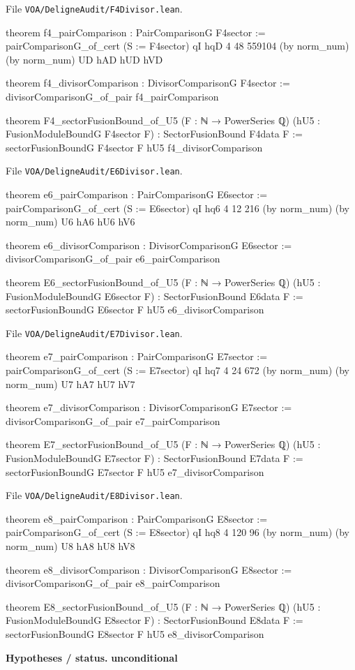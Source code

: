 \documentclass[11pt,openany]{book}
\newcommand{\leanpath}[1]{\texttt{\small #1}}
\theoremstyle{definition}
\theoremstyle{plain}
\begin{document}
{\raggedright\noindent File \leanpath{VOA/\allowbreak DeligneAudit/\allowbreak F4Divisor.lean}.\par}
\begin{leancode}
theorem f4_pairComparison : PairComparisonG F4sector :=
  pairComparisonG_of_cert (S := F4sector) qI hqD 4 48 559104 (by norm_num) (by norm_num) UD hAD hUD hVD

theorem f4_divisorComparison : DivisorComparisonG F4sector :=
  divisorComparisonG_of_pair f4_pairComparison

theorem F4_sectorFusionBound_of_U5 (F : ℕ → PowerSeries ℚ) (hU5 : FusionModuleBoundG F4sector F) :
    SectorFusionBound F4data F :=
  sectorFusionBoundG F4sector F hU5 f4_divisorComparison
\end{leancode}
{\raggedright\noindent File \leanpath{VOA/\allowbreak DeligneAudit/\allowbreak E6Divisor.lean}.\par}
\begin{leancode}
theorem e6_pairComparison : PairComparisonG E6sector :=
  pairComparisonG_of_cert (S := E6sector) qI hq6 4 12 216 (by norm_num) (by norm_num) U6 hA6 hU6 hV6

theorem e6_divisorComparison : DivisorComparisonG E6sector :=
  divisorComparisonG_of_pair e6_pairComparison

theorem E6_sectorFusionBound_of_U5 (F : ℕ → PowerSeries ℚ) (hU5 : FusionModuleBoundG E6sector F) :
    SectorFusionBound E6data F :=
  sectorFusionBoundG E6sector F hU5 e6_divisorComparison
\end{leancode}
{\raggedright\noindent File \leanpath{VOA/\allowbreak DeligneAudit/\allowbreak E7Divisor.lean}.\par}
\begin{leancode}
theorem e7_pairComparison : PairComparisonG E7sector :=
  pairComparisonG_of_cert (S := E7sector) qI hq7 4 24 672 (by norm_num) (by norm_num) U7 hA7 hU7 hV7

theorem e7_divisorComparison : DivisorComparisonG E7sector :=
  divisorComparisonG_of_pair e7_pairComparison

theorem E7_sectorFusionBound_of_U5 (F : ℕ → PowerSeries ℚ) (hU5 : FusionModuleBoundG E7sector F) :
    SectorFusionBound E7data F :=
  sectorFusionBoundG E7sector F hU5 e7_divisorComparison
\end{leancode}
{\raggedright\noindent File \leanpath{VOA/\allowbreak DeligneAudit/\allowbreak E8Divisor.lean}.\par}
\begin{leancode}
theorem e8_pairComparison : PairComparisonG E8sector :=
  pairComparisonG_of_cert (S := E8sector) qI hq8 4 120 96 (by norm_num) (by norm_num) U8 hA8 hU8 hV8

theorem e8_divisorComparison : DivisorComparisonG E8sector :=
  divisorComparisonG_of_pair e8_pairComparison

theorem E8_sectorFusionBound_of_U5 (F : ℕ → PowerSeries ℚ) (hU5 : FusionModuleBoundG E8sector F) :
    SectorFusionBound E8data F :=
  sectorFusionBoundG E8sector F hU5 e8_divisorComparison
\end{leancode}
\noindent\textbf{Hypotheses / status.} \textbf{unconditional}\par
\medskip
\endgroup
\setcounter{chapter}{24}
\end{document}
